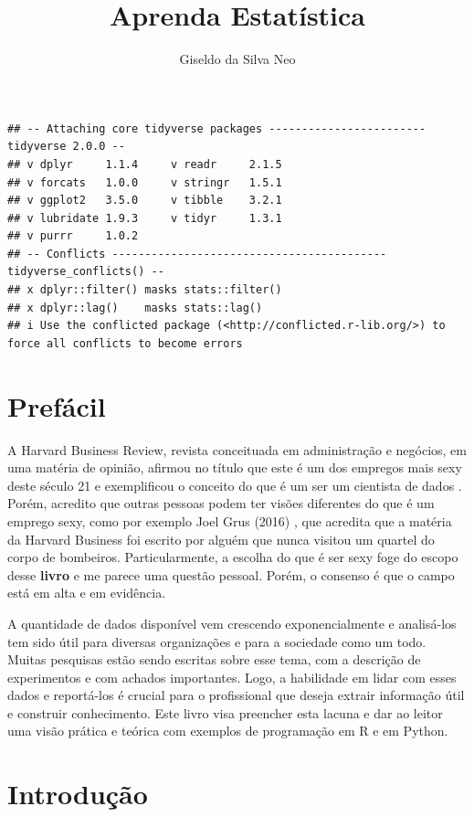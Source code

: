 \documentclass[
]{book}
\title{Aprenda Estatística}
\author{Giseldo da Silva Neo}
\date{}
\begin{document}
\maketitle

{
\setcounter{tocdepth}{1}
\tableofcontents
}
\begin{verbatim}
## -- Attaching core tidyverse packages ------------------------ tidyverse 2.0.0 --
## v dplyr     1.1.4     v readr     2.1.5
## v forcats   1.0.0     v stringr   1.5.1
## v ggplot2   3.5.0     v tibble    3.2.1
## v lubridate 1.9.3     v tidyr     1.3.1
## v purrr     1.0.2     
## -- Conflicts ------------------------------------------ tidyverse_conflicts() --
## x dplyr::filter() masks stats::filter()
## x dplyr::lag()    masks stats::lag()
## i Use the conflicted package (<http://conflicted.r-lib.org/>) to force all conflicts to become errors
\end{verbatim}

\hypertarget{prefuxe1cil}{%
\chapter{Prefácil}\label{prefuxe1cil}}

A Harvard Business Review, revista conceituada em administração e negócios, em uma matéria de opinião, afirmou no título que este é um dos empregos mais sexy deste século 21 e exemplificou o conceito do que é um ser um cientista de dados \citep{hbr2012}. Porém, acredito que outras pessoas podem ter visões diferentes do que é um emprego sexy, como por exemplo Joel Grus (2016) \citep{grus2016}, que acredita que a matéria da Harvard Business foi escrito por alguém que nunca visitou um quartel do corpo de bombeiros. Particularmente, a escolha do que é ser sexy foge do escopo desse \textbf{livro} e me parece uma questão pessoal. Porém, o consenso é que o campo está em alta e em evidência.

A quantidade de dados disponível vem crescendo exponencialmente e analisá-los tem sido útil para diversas organizações e para a sociedade como um todo. Muitas pesquisas estão sendo escritas sobre esse tema, com a descrição de experimentos e com achados importantes. Logo, a habilidade em lidar com esses dados e reportá-los é crucial para o profissional que deseja extrair informação útil e construir conhecimento. Este livro visa preencher esta lacuna e dar ao leitor uma visão prática e teórica com exemplos de programação em R e em Python.

\hypertarget{introduuxe7uxe3o}{%
\chapter{Introdução}\label{introduuxe7uxe3o}}
\end{document}
